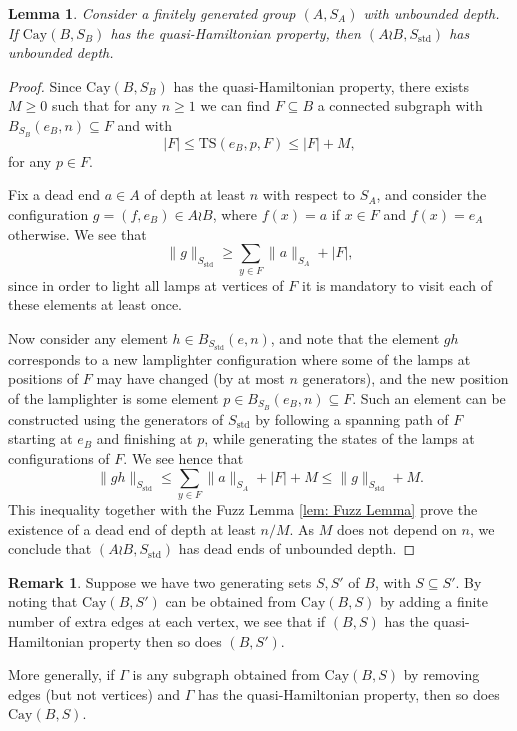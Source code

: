 \documentclass[reqno,oneside]{amsart}
\newcommand{\cay}[2]{\mathrm{Cay}(#1,#2)}
\newcommand{\std}{S_{\mathrm{std}}}
\newcommand{\TS}[3]{\mathrm{TS}\left(#1,#2,#3\right)}
\theoremstyle{plain}
\newtheorem{lem}[thm]{Lemma}
\theoremstyle{definition}
\newtheorem{rem}[thm]{Remark}
\begin{document}
\begin{lem}\label{lem: Hamiltonian sequence implies unbounded depth}
	Consider a finitely generated group $(A,S_A)$ with unbounded depth. If $\cay{B}{S_B}$ has the quasi-Hamiltonian property, then $\displaystyle\left (A \wr B,\std \right)$ has unbounded depth.
\end{lem}
\begin{proof}
	
	Since $\cay{B}{S_B}$ has the quasi-Hamiltonian property, there exists $M\ge 0$ such that for any $n\ge 1$ we can find $F\subseteq B$ a connected subgraph with $B_{S_B}(e_B,n)\subseteq F$ and with 
	$$
	|F|\le\TS{e_B}{p}{F}\le |F|+M,
	$$
	for any $p\in F$.
	
	Fix a dead end $a\in A$ of depth at least $n$ with respect to $S_A$, and consider the configuration $g=(f,e_B)\in A \wr B$, where $f(x)=a$ if $x\in F$ and $f(x)=e_A$ otherwise. We see that $$\|g\|_{\std}\ge \sum_{y\in F}\|a\|_{S_A} +|F|,$$ since in order to light all lamps at vertices of $F$ it is mandatory to visit each of these elements at least once.
	
	Now consider any element $h\in B_{\std}(e,n)$, and note that the element $gh$ corresponds to a new lamplighter configuration where some of the lamps at positions of $F$ may have changed (by at most $n$ generators), and the new position of the lamplighter is some element $p\in B_{S_B}(e_B,n)\subseteq F$. Such an element can be constructed using the generators of $\std$ by following a spanning path of $F$ starting at $e_B$ and finishing at $p$, while generating the states of the lamps at configurations of $F$. We see hence that
	$$
	\|gh\|_{\std}\le \sum_{y\in F}\|a\|_{S_A}+ |F|+M \le \|g\|_{\std}+M.
	$$
	This inequality together with the Fuzz Lemma \ref{lem: Fuzz Lemma} prove the existence of a dead end of depth at least $n/M$. As $M$ does not depend on $n$, we conclude that $(A\wr B,\std)$ has dead ends of unbounded depth.
\end{proof}

\begin{rem}\label{remark: super generating sets and hamiltonian sequences} Suppose we have two generating sets $S,S'$ of $B$, with $S\subseteq S'$. By noting that $\cay{B}{S'}$ can be obtained from $\cay{B}{S}$ by adding a finite number of extra edges at each vertex, we see that if $(B,S)$ has the quasi-Hamiltonian property then so does $(B,S').$ 
	
	More generally, if $\Gamma$ is any subgraph obtained from $\cay{B}{S}$ by removing edges (but not vertices) and $\Gamma$ has the quasi-Hamiltonian property, then so does $\cay{B}{S}$.
\end{rem}
\end{document}
